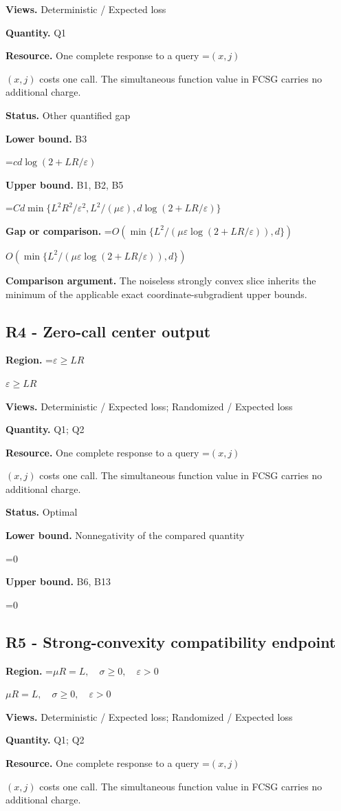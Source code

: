 \documentclass[10pt,a4paper]{article}
\newcommand{\AtlasMath}[1]{\par\begingroup\centering\setbox0=\hbox{$\displaystyle #1$}\ifdim\wd0>1.4\linewidth\typeout{ATLAS WIDE FORMULA: \the\wd0}\fi\ifdim\wd0>\linewidth\resizebox{\linewidth}{!}{\box0}\else\box0\fi\par\endgroup}
\newcommand{\AtlasInlineMath}[1]{\begingroup\setbox0=\hbox{$#1$}\ifdim\wd0>.4\linewidth\endgroup\AtlasMath{#1}\else\endgroup$#1$\fi}
\begin{document}
\textbf{Views.} Deterministic / Expected loss

\textbf{Quantity.} Q1

\textbf{Resource.} One complete response to a query \AtlasInlineMath{(x,j)} costs one call. The simultaneous function value in FCSG carries no additional charge.

\textbf{Status.} Other quantified gap

\textbf{Lower bound.} B3

\AtlasMath{cd\log(2+LR/\varepsilon)}
\textbf{Upper bound.} B1, B2, B5

\AtlasMath{Cd\min\{L^2R^2/\varepsilon^2,L^2/(\mu\varepsilon),d\log(2+LR/\varepsilon)\}}
\textbf{Gap or comparison.} \AtlasInlineMath{O\!\left(\min\{L^2/(\mu\varepsilon\log(2+LR/\varepsilon)),d\}\right)}

\textbf{Comparison argument.} The noiseless strongly convex slice inherits the minimum of the applicable exact coordinate-subgradient upper bounds.

\subsection{R4 - Zero-call center output}
\textbf{Region.} \AtlasInlineMath{\varepsilon\ge LR}

\textbf{Views.} Deterministic / Expected loss; Randomized / Expected loss

\textbf{Quantity.} Q1; Q2

\textbf{Resource.} One complete response to a query \AtlasInlineMath{(x,j)} costs one call. The simultaneous function value in FCSG carries no additional charge.

\textbf{Status.} Optimal

\textbf{Lower bound.} Nonnegativity of the compared quantity

\AtlasMath{0}
\textbf{Upper bound.} B6, B13

\AtlasMath{0}
\subsection{R5 - Strong-convexity compatibility endpoint}
\textbf{Region.} \AtlasInlineMath{\mu R=L,\quad\sigma\ge0,\quad\varepsilon>0}

\textbf{Views.} Deterministic / Expected loss; Randomized / Expected loss

\textbf{Quantity.} Q1; Q2

\textbf{Resource.} One complete response to a query \AtlasInlineMath{(x,j)} costs one call. The simultaneous function value in FCSG carries no additional charge.
\end{document}

